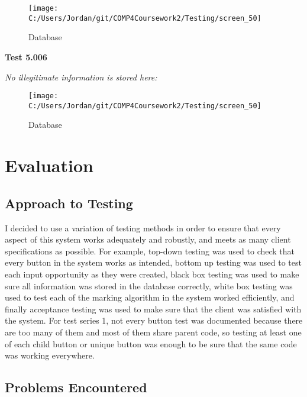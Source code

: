 \begin{figure}[H]
    \label{fig: Second Screen}\caption{Database}
    \texttt{[image: C:/Users/Jordan/git/COMP4Coursework2/Testing/screen\_50]}
\end{figure}

\textbf{Test 5.006}

\textit{No illegitimate information is stored here: }

\begin{figure}[H]
    \label{fig: Second Screen}\caption{Database}
    \texttt{[image: C:/Users/Jordan/git/COMP4Coursework2/Testing/screen\_50]}
\end{figure}

\section{Evaluation}

\subsection{Approach to Testing}

I decided to use a variation of testing methods in order to ensure that every aspect of this system works adequately and robustly, and meets as many client specifications as possible. For example, top-down testing was used to check that every button in the system works as intended, bottom up testing was used to test each input opportunity as they were created, black box testing was used to make sure all information was stored in the database correctly, white box testing was used to test each of the marking algorithm in the system worked efficiently, and finally acceptance testing was used to make sure that the client was satisfied with the system. For test series 1, not every button test was documented because there are too many of them and most of them share parent code, so testing at least one of each child button or unique button was enough to be sure that the same code was working everywhere.

\subsection{Problems Encountered}

